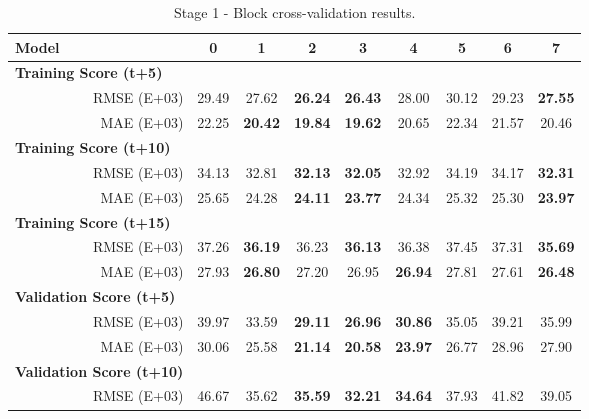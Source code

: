 \begin{table}[htbp]
  \centering
  \caption{Stage 1 - Block cross-validation results.}
    \begin{tabular}{cr|cccccccc}
    \toprule
    \multicolumn{1}{l}{\textbf{Model}} &       & 0     & 1     & 2     & \textbf{3} & 4     & 5     & 6     & 7 \\
    \midrule
    \multicolumn{2}{l|}{\textbf{Training Score (t+5)}} &       &       &       &       &       &       &       &  \\
          & RMSE (E+03) & 29.49 & 27.62 & \textbf{26.24} & \textbf{26.43} & 28.00 & 30.12 & 29.23 & \textbf{27.55} \\
          & MAE (E+03) & 22.25 & \textbf{20.42} & \textbf{19.84} & \textbf{19.62} & 20.65 & 22.34 & 21.57 & 20.46 \\
    \multicolumn{2}{l|}{\textbf{Training Score (t+10)}} &       &       &       &       &       &       &       &  \\
          & RMSE (E+03) & 34.13 & 32.81 & \textbf{32.13} & \textbf{32.05} & 32.92 & 34.19 & 34.17 & \textbf{32.31} \\
          & MAE (E+03) & 25.65 & 24.28 & \textbf{24.11} & \textbf{23.77} & 24.34 & 25.32 & 25.30 & \textbf{23.97} \\
    \multicolumn{2}{l|}{\textbf{Training Score (t+15)}} &       &       &       &       &       &       &       &  \\
          & RMSE (E+03) & 37.26 & \textbf{36.19} & 36.23 & \textbf{36.13} & 36.38 & 37.45 & 37.31 & \textbf{35.69} \\
          & MAE (E+03) & 27.93 & \textbf{26.80} & 27.20 & 26.95 & \textbf{26.94} & 27.81 & 27.61 & \textbf{26.48} \\
    \midrule
    \multicolumn{2}{l|}{\textbf{Validation Score (t+5)}} &       &       &       &       &       &       &       &  \\
          & RMSE (E+03) & 39.97 & 33.59 & \textbf{29.11} & \textbf{26.96} & \textbf{30.86} & 35.05 & 39.21 & 35.99 \\
          & MAE (E+03) & 30.06 & 25.58 & \textbf{21.14} & \textbf{20.58} & \textbf{23.97} & 26.77 & 28.96 & 27.90 \\
    \multicolumn{2}{l|}{\textbf{Validation Score (t+10)}} &       &       &       &       &       &       &       &  \\
          & RMSE (E+03) & 46.67 & 35.62 & \textbf{35.59} & \textbf{32.21} & \textbf{34.64} & 37.93 & 41.82 & 39.05 \\

\end{tabular}
\end{table}
